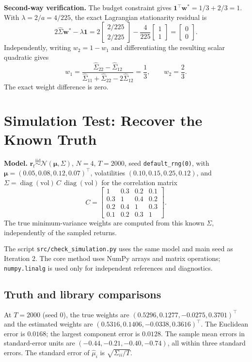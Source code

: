 \documentclass[11pt]{article}
\newcommand{\one}{\mathbf{1}}
\newcommand{\w}{\bm{w}}
\newcommand{\bmu}{\bm{\mu}}
\begin{document}
\textbf{Second-way verification.}
The budget constraint gives $\one^\top\w^*=1/3+2/3=1$.
With $\lambda=2/a=4/225$, the exact Lagrangian stationarity residual is
\[
2\hat\Sigma\w^*-\lambda\one=
2\begin{bmatrix}2/225\\2/225\end{bmatrix}
-\frac4{225}\begin{bmatrix}1\\1\end{bmatrix}
=\begin{bmatrix}0\\0\end{bmatrix}.
\]
Independently, writing $w_2=1-w_1$ and differentiating the resulting
scalar quadratic gives
\[
w_1=\frac{\hat\Sigma_{22}-\hat\Sigma_{12}}
{\hat\Sigma_{11}+\hat\Sigma_{22}-2\hat\Sigma_{12}}=\frac13,\qquad
w_2=\frac23.
\]
The exact weight difference is zero.

\section{Simulation Test: Recover the Known Truth}
\textbf{Model.} $\bm r_t \overset{\text{iid}}{\sim}\mathcal N(\bmu,\Sigma)$, $N=4$, $T=2000$, seed \texttt{default\_rng(0)}, with
$\bmu=(0.05,0.08,0.12,0.07)^\top$, volatilities $(0.10,0.15,0.25,0.12)$, and $\Sigma = \operatorname{diag}(\text{vol})\,C\,\operatorname{diag}(\text{vol})$ for the correlation matrix
\[
C=\begin{bmatrix}
1&0.3&0.2&0.1\\
0.3&1&0.4&0.2\\
0.2&0.4&1&0.3\\
0.1&0.2&0.3&1
\end{bmatrix}.
\]
The true minimum-variance weights are computed from this known $\Sigma$,
independently of the sampled returns.

The script \texttt{src/check\_simulation.py} uses the same model and main
seed as Iteration 2. The core method uses NumPy arrays and matrix operations; \texttt{numpy.linalg} is used only for independent references and diagnostics.

\subsection{Truth and library comparisons}
At $T=2000$ (seed 0), the true weights are
$(0.5296,0.1277,-0.0275,0.3701)^\top$ and the estimated weights are
$(0.5316,0.1406,-0.0338,0.3616)^\top$.
The Euclidean error is $0.0168$; the largest component error is $0.0128$.
The sample mean errors in standard-error units are
$(-0.44,-0.21,-0.40,-0.74)$, all within three standard errors.
The standard error of $\hat\mu_i$ is $\sqrt{\Sigma_{ii}/T}$.
\end{document}
